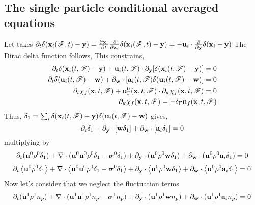 \documentclass[11pt]{My_preprint}
\begin{document}
\subsection*{The single particle conditional averaged equations}
Let takes 
$\partial_t \delta(\textbf{x}_i(\mathscr{F},t) - \textbf{y}) 
= \frac{\partial \textbf{x}_i}{\partial t} \frac{\partial }{\partial \textbf{x}_i} \delta(\textbf{x}_i(\mathscr{F},t) - \textbf{y})
= - \textbf{u}_i \cdot \frac{\partial }{\partial \textbf{y}} \delta(\textbf{x}_i - \textbf{y})$
The Dirac delta function follows, This constrains,
\begin{align*}
    \partial_t \delta(\textbf{x}_i(t,\mathscr{F})  - \textbf{y})
    +\textbf{u}_i(t,\mathscr{F})  \cdot {\partial_\textbf{y}} [ \delta(\textbf{x}_i(t,\mathscr{F})  - \textbf{y})]
    = 0\\
    \partial_t \delta(\textbf{u}_i(t,\mathscr{F}) -\textbf{w})
    + {\partial_\textbf{w}} \cdot [\textbf{a}_i(t,\mathscr{F})  \delta(\textbf{u}_i(t,\mathscr{F})  - \textbf{w})]
    = 0\\
    \partial_t \chi_f(\textbf{x},t,\mathscr{F}) 
    + \textbf{u}_\Gamma^0(\textbf{x},t,\mathscr{F}) \cdot {\partial_\textbf{x}} \chi_f(\textbf{x},t,\mathscr{F}) = 0 \\
    {\partial_\textbf{x}} \chi_f(\textbf{x},t,\mathscr{F}) = - \delta_\Gamma \textbf{n}_f(\textbf{x},t,\mathscr{F})
\end{align*}
Thus, $\delta_1 =\sum_i \delta(\textbf{x}_i(t,\mathscr{F})  - \textbf{y})\delta(\textbf{u}_i(t,\mathscr{F}) -\textbf{w})$ gives,
\begin{equation*}
    \partial_t \delta_1 
    + {\partial_\textbf{y}}\cdot [\textbf{w} \delta_1 ]
    + {\partial_\textbf{w}}\cdot [\textbf{a}_i \delta_1 ]
    =0 
\end{equation*} 
multiplying by 
\begin{align*}
    \partial_t (\textbf{u}^0 \rho^0\delta_1) + \mathbf{\nabla}\cdot(\textbf{u}^0 \textbf{u}^0 \rho^0 \delta_1 - \bm\sigma^0\delta_1) 
    +{\partial_\textbf{y}}\cdot (\textbf{u}^0 \rho^0  \textbf{w}\delta_1)
    +{\partial_\textbf{w}}\cdot (\textbf{u}^0 \rho^0  \textbf{a}_i\delta_1) = 0 \\
\end{align*}
\begin{align*}
    \partial_t \left<\textbf{u}^0 \rho^0\delta_1\right> 
    + \mathbf{\nabla}\cdot\left<\textbf{u}^0 \textbf{u}^0 \rho^0 \delta_1 - \bm\sigma^0\delta_1\right>
    +{\partial_\textbf{y}}\cdot \left<\textbf{u}^0 \rho^0  \textbf{w}\delta_1\right>
    +{\partial_\textbf{w}}\cdot \left<\textbf{u}^0 \rho^0  \textbf{a}_i\delta_1\right> 
    = 0 \\
\end{align*}
Now let's consider that we neglect the fluctuation terms
\begin{align*}
    \partial_t (\textbf{u}^1 \rho^1n_p) + \mathbf{\nabla}\cdot(\textbf{u}^1 \textbf{u}^1 \rho^1 n_p - \bm\sigma^1n_p) 
    +{\partial_\textbf{y}}\cdot (\textbf{u}^1 \rho^1  \textbf{w}n_p)
    +{\partial_\textbf{w}}\cdot (\textbf{u}^1 \rho^1  \textbf{a}_in_p) = 0 \\
\end{align*}
\end{document}
